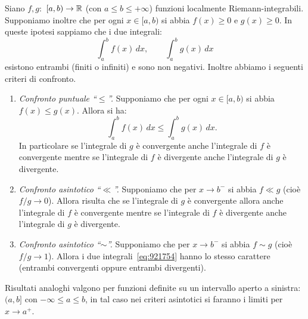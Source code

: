 \begin{theorem}
\mymark{**}
Siano $f, g \colon$ $ [a,b)\to {\mathbb R}$ (con $a \le b \le +\infty$)
funzioni localmente Riemann-integrabili. Supponiamo inoltre che
per ogni $x\in [a,b)$ si abbia $f(x)\ge 0$ e $g(x)\ge 0$.
In queste ipotesi sappiamo che i due integrali:
\begin{equation}\label{eq:921754}
  \int_a^b f(x)\, dx, \qquad \int_a^b g(x)\, dx
\end{equation}
esistono entrambi (finiti o infiniti) e sono non negativi.
Inoltre abbiamo i seguenti criteri di confronto.

\begin{enumerate}
\item \emph{Confronto puntuale ``$\le$''.}
Supponiamo che per ogni $x\in [a,b)$ si abbia $f(x) \le g(x)$. Allora
si ha:
\begin{equation}\label{eq:467143}
  \int_a^b f(x)\, dx \le \int_a^b g(x)\, dx.
\end{equation}
In particolare se l'integrale di $g$ è convergente anche l'integrale di
$f$ è convergente mentre se l'integrale di $f$ è divergente anche l'integrale
di $g$ è divergente.

\item \emph{Confronto asintotico ``$\ll$''.}
Supponiamo che per $x\to b^-$ si abbia $f \ll g$ (cioè $f/g\to 0$).
Allora risulta che
se l'integrale di $g$ è convergente allora anche l'integrale di $f$ è convergente
mentre se l'integrale di $f$ è divergente anche l'integrale di $g$ è divergente.

\item \emph{Confronto asintotico ``$\sim$''.}
Supponiamo che per $x\to b^-$ si abbia $f\sim g$ (cioè $f/g\to 1$).
Allora i due integrali~\eqref{eq:921754}
hanno lo stesso carattere (entrambi convergenti oppure entrambi divergenti).
\end{enumerate}

Risultati analoghi valgono per funzioni definite su un intervallo aperto a
sinistra: $(a, b]$ con $-\infty \le a \le b$,
in tal caso nei criteri asintotici si faranno i limiti per $x\to a^+$.
\end{theorem}
%
